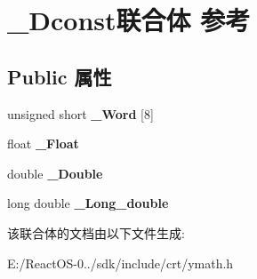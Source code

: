 \hypertarget{union___dconst}{}\section{\+\_\+\+Dconst联合体 参考}
\label{union___dconst}
\subsection*{Public 属性}
\begin{DoxyCompactItemize}
\item 
\mbox{\label{union___dconst_affc00fc5e3359dff0fa5fb3333ff3cec}} 
unsigned short {\bfseries \+\_\+\+Word} \mbox{[}8\mbox{]}
\item 
\mbox{\label{union___dconst_a924b6e78f928ed2a7f69daa93a103807}} 
float {\bfseries \+\_\+\+Float}
\item 
\mbox{\label{union___dconst_a6479c58460c0d5234e7374a5a9249d15}} 
double {\bfseries \+\_\+\+Double}
\item 
\mbox{\label{union___dconst_ab90d8c745bdef07fcd295b0e2e987a9a}} 
long double {\bfseries \+\_\+\+Long\+\_\+double}
\end{DoxyCompactItemize}


该联合体的文档由以下文件生成\+:\begin{DoxyCompactItemize}
\item 
E\+:/\+React\+O\+S-\/0../sdk/include/crt/ymath.\+h\end{DoxyCompactItemize}
